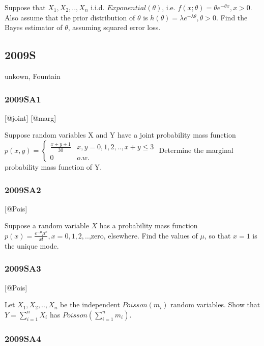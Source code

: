 \documentclass[6pt,Portrait]{article}
\begin{document}
Suppose that \(X_1,X_2,..,X_n\) i.i.d. \(Exponential(\theta)\), i.e.
\(f(x;\theta)=\theta e^{-\theta x},x>0\). Also assume that the prior
distribution of \(\theta\) is
\(h(\theta)=\lambda e^{-\lambda\theta},\theta>0\). Find the Bayes
estimator of \(\theta\), assuming squared error loss.

\hypertarget{s-3}{%
\subsection{2009S}\label{s-3}}

unkown, Fountain

\hypertarget{sa1}{%
\subsubsection{2009SA1}\label{sa1}}

{[}@joint{]} {[}@marg{]}

Suppose random variables X and Y have a joint probability mass function
\(p(x,y)=\begin{cases}\frac{x+y+1}{30}& x,y=0,1,2,..,x+y\le3\\0& o.w.\end{cases}\)
Determine the marginal probability mass function of Y.

\hypertarget{sa2}{%
\subsubsection{2009SA2}\label{sa2}}

{[}@Pois{]}

Suppose a random variable \(X\) has a probability mass function
\(p(x)=\frac{e^{-\mu}\mu^x}{x!},x=0,1,2,..\),zero, elsewhere. Find the
values of \(\mu\), so that \(x=1\) is the unique mode.

\hypertarget{sa3}{%
\subsubsection{2009SA3}\label{sa3}}

{[}@Pois{]}

Let \(X_1,X_2,..,X_n\) be the independent \(Poisson(m_i)\) random
variables. Show that \(Y=\sum_{i=1}^n X_i\) has
\(Poisson(\sum_{i=1}^n m_i)\).

\hypertarget{sa4}{%
\subsubsection{2009SA4}\label{sa4}}
\end{document}
